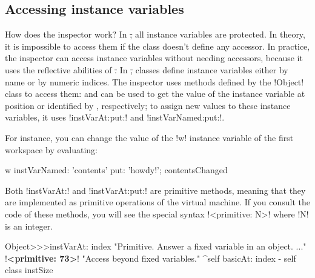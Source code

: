 \documentclass[a4paper,10pt,twoside]{book}
\begin{document}
\subsection{Accessing instance variables}

How does the inspector work?
In \st, all instance variables are protected.
In theory, it is impossible to access them if the class doesn't define any accessor.
In practice, the inspector can access instance variables without needing accessors, because it uses the reflective abilities of \st.
In \st, classes define instance variables either by name or by numeric indices.
The inspector uses methods defined by the \ct!Object! class to access them:  and  can be used to get the value of the instance variable at position  or identified by , respectively; to assign new values to these instance variables, it uses \ct!instVarAt:put:! and \ct!instVarNamed:put:!.

For instance, you can change the value of the \ct!w! instance variable  of the first workspace by evaluating:
\begin{code}{}
w instVarNamed: 'contents' put: 'howdy!'; contentsChanged
\end{code}


Both \ct!instVarAt:! and \ct!instVarAt:put:! are primitive methods, meaning that they are implemented as primitive operations of the \pharo virtual machine.
If you consult the code of these methods, you will see the special syntax \ct!<primitive: N>! where \ct!N! is an integer. 

\begin{code}{}
Object>>>instVarAt: index 
	"Primitive. Answer a fixed variable in an object. ..."
	!\textbf{<primitive: 73>}!
	"Access beyond fixed variables."
	^self basicAt: index - self class instSize		
\end{code}
\end{document}
